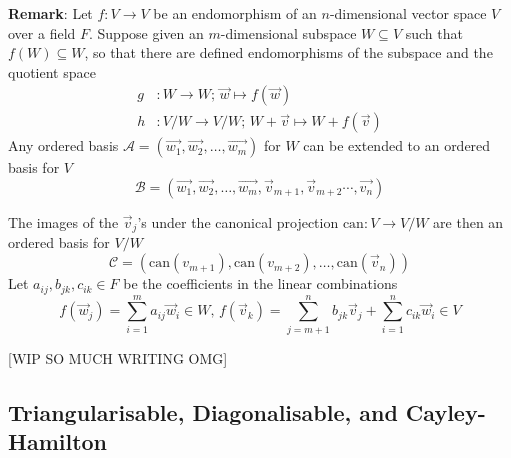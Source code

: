 \documentclass[landscape, 8pt]{extarticle}
\begin{document}
\begin{multicols}{3}
\textbf{Remark}: Let $f : V\to V$ be an endomorphism of an $n$-dimensional vector space $V$ over a field $F$. Suppose given an $m$-dimensional subspace $W\subseteq V$ such that $f(W)\subseteq W$, so that there are defined endomorphisms of the subspace and the quotient space
\begin{align*}
    g &: W \to W;\, \vec{w}\mapsto f(\vec{w})\\
    h &: V / W \to V / W;\, W + \vec{v} \mapsto W + f(\vec{v})
\end{align*}
Any ordered basis $\mathcal{A} = (\vec{w_{1}},\vec{w_{2}},\dots,\vec{w_{m}})$ for $W$ can be extended to an ordered basis for $V$
\[\mathcal{B} = (\vec{w_{1}}, \vec{w_{2}},\dots,\vec{w_{m}},\vec{v}_{m+1},\vec{v}_{m+2}\cdots,\vec{v_{n}})\]

The images of the $\vec{v}_{j}$'s under the canonical projection $\text{can} : V\to V / W$ are then an ordered basis for $V / W$
\[\mathcal{C} = (\text{can}(v_{m + 1}), \text{can}(v_{m + 2}),\dots,\text{can}(\vec{v}_{n}))\]
Let $a_{ij},b_{jk},c_{ik}\in F$ be the coefficients in the linear combinations
\[f(\vec{w}_{j}) = \sum_{i = 1}^{m}a_{ij}\vec{w}_{i}\in W,\,f(\vec{v}_{k}) = \sum_{j = m+1}^{n} b_{jk}\vec{v}_{j} + \sum_{i = 1}^{n}c_{ik}\vec{w}_{i}\in V\]

[WIP SO MUCH WRITING OMG]

\subsection{Triangularisable, Diagonalisable, and Cayley-Hamilton}


\end{multicols}
\end{document}
